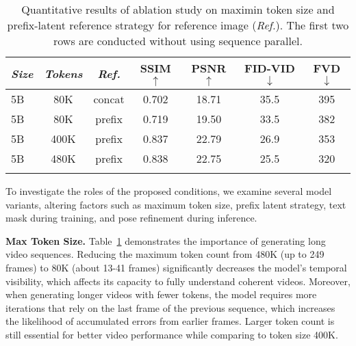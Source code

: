 \begin{table}[t]
    \centering
    \footnotesize
    \begin{tabular}{p{0.3cm}cc|cccc}
    \Xhline{1pt}
        \textit{Size} & \textit{Tokens} & \textit{Ref.} & SSIM$\uparrow$ & PSNR$\uparrow$  & FID-VID$\downarrow$  & FVD$\downarrow$  \\ \hline
        5B & 80K & concat & 0.702 & 18.71 & 35.5  & 395 \\
        5B & 80K & prefix & 0.719 & 19.50 & 33.5 & 382 \\ \hline
        5B & 400K & prefix & 0.837 & \cellcolor[HTML]{D9D9D9}22.79 & 26.9 & 353 \\
      5B & 480K &
        prefix & \cellcolor[HTML]{D9D9D9}0.838 & 22.75 & \cellcolor[HTML]{D9D9D9}25.5 & \cellcolor[HTML]{D9D9D9}320 \\ \Xhline{1pt}
    \end{tabular}
    \vspace{-0.1in}
    \caption{Quantitative results of ablation study on maximin token size and prefix-latent reference strategy for reference image (\textit{Ref.}). The first two rows are conducted without using sequence parallel. }
    \vspace{-0.2in}
    \label{tab:abl}
\end{table}


To investigate the roles of the proposed conditions, we examine several model variants, altering factors such as maximum token size, prefix latent strategy, text mask during training, and pose refinement during inference.


\noindent\textbf{Max Token Size.} Table~\ref{tab:abl} demonstrates the importance of generating long video sequences. Reducing the maximum token count from 480K (up to 249 frames) to 80K (about 13-41 frames) significantly decreases the model's temporal visibility, which affects its capacity to fully understand coherent videos. Moreover, when generating longer videos with fewer tokens, the model requires more iterations that rely on the last frame of the previous sequence, which increases the likelihood of accumulated errors from earlier frames. Larger token count is still essential for better video performance while comparing to token size 400K. 

